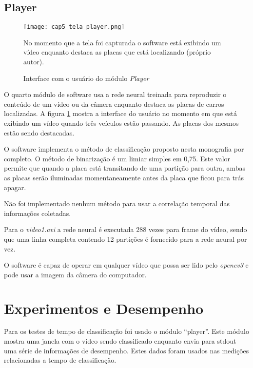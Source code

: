 \subsection{Player}

\begin{figure}[!htb]
	\centering
	\texttt{[image: cap5\_tela\_player.png]}
	\caption{Interface com o usuário do módulo \emph{Player}}
	\label{fig:cap5_tela_player}
	No momento que a tela foi capturada o software está exibindo um vídeo
	enquanto destaca as placas que está localizando (próprio autor).
\end{figure}

O quarto módulo de software usa a rede neural treinada para reproduzir o
conteúdo de um vídeo ou da câmera enquanto destaca as placas de carros
localizadas. A figura \ref{fig:cap5_tela_player} mostra a interface do usuário
no momento em que está exibindo um vídeo quando três veículos estão passando.
As placas dos mesmos estão sendo destacadas.

O software implementa o método de classificação proposto nesta monografia por
completo. O método de binarização é um limiar simples em 0,75. Este valor
permite que quando a placa está transitando de uma partição para outra, ambas
as placas serão iluminadas momentaneamente antes da placa que ficou para trás
apagar.

Não foi implementado nenhum método para usar a correlação temporal das
informações coletadas.

Para o \emph{video1.avi} a rede neural é executada 288 vezes para frame do
vídeo, sendo que uma linha completa contendo 12 partições é fornecido para a
rede neural por vez.

O software é capaz de operar em qualquer vídeo que possa ser lido pelo
\emph{opencv3} e pode usar a imagem da câmera do computador.

\section{Experimentos e Desempenho}

Para os testes de tempo de classificação foi usado o módulo “player”. Este
módulo mostra uma janela com o vídeo sendo classificado enquanto envia para
stdout uma série de informações de desempenho. Estes dados foram usados nas
medições relacionadas a tempo de classificação.


